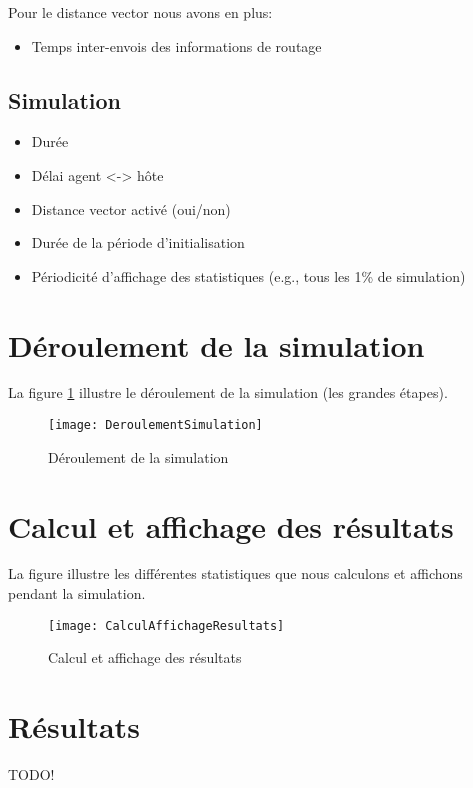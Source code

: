 \documentclass[a4paper,11pt]{article}
\begin{document}
Pour le distance vector nous avons en plus:
\begin{itemize}
 \item Temps inter-envois des informations de routage
\end{itemize}

\subsection{Simulation}
\begin{itemize}
 \item Durée
 \item Délai agent <-> hôte
 \item Distance vector activé (oui/non)
 \item Durée de la période d'initialisation
 \item Périodicité d'affichage des statistiques (e.g., tous les 1\% de simulation)
\end{itemize}









\section{Déroulement de la simulation}
La figure \ref{fig:deroulement-simulation} illustre le déroulement de la simulation (les grandes étapes).

\begin{figure}[h!t]
  \centering
    \texttt{[image: DeroulementSimulation]}
  \caption{Déroulement de la simulation}
  \label{fig:deroulement-simulation}
\end{figure}







\section{Calcul et affichage des résultats}
La figure  illustre les différentes statistiques que nous calculons et affichons pendant la simulation.

\begin{figure}[h!t]
  \centering
    \texttt{[image: CalculAffichageResultats]}
  \caption{Calcul et affichage des résultats}
  \label{fig:calcul-affichage-resultats}
\end{figure}






\section{Résultats}
TODO!








\clearpage


\appendix
\end{document}
